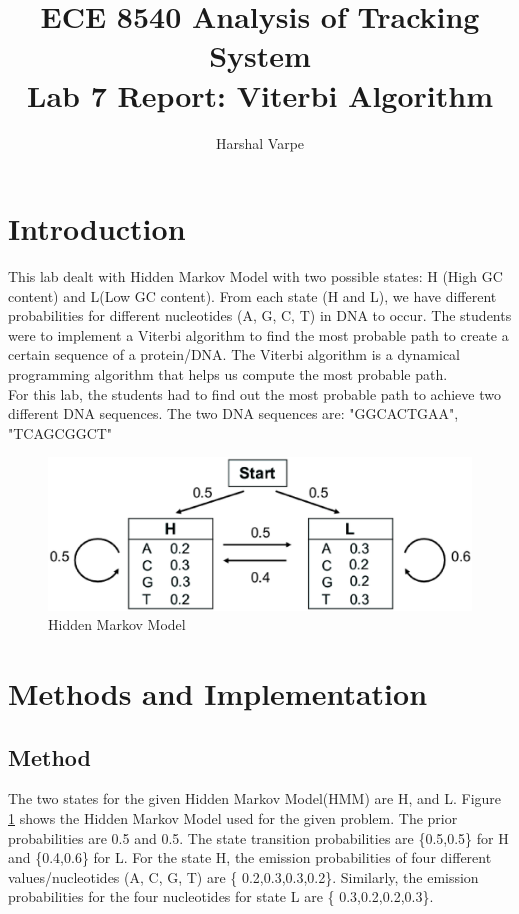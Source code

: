 \documentclass{article}
\author{ Harshal Varpe}
\title{ECE 8540 Analysis of Tracking System\\
\Large Lab 7 Report: Viterbi Algorithm }
\begin{document}
\maketitle

\section{Introduction}\label{sec:intro}

This lab dealt with Hidden Markov Model with two possible states: H (High GC content) and L(Low GC content). From each state (H and L), we have different probabilities for different nucleotides (A, G, C, T) in DNA to occur. The students were to implement a Viterbi algorithm to find the most probable path to create a certain sequence of a protein/DNA. The Viterbi algorithm is a dynamical programming algorithm that helps us compute the most probable path. \\
For this lab, the students had to find out the most probable path to achieve two different DNA sequences. The two DNA sequences are: "GGCACTGAA", "TCAGCGGCT" \\
\begin{figure}[!htb]
\begin{center}
\includegraphics[scale=0.5]{HMM.eps}
\caption{Hidden Markov Model}
\label{Fig:1}
\end{center}
\end{figure}

\section{Methods and Implementation}\label{sec:methImp}
\subsection{Method}\label{sec:Meth}
The two states for the given Hidden Markov Model(HMM) are H, and L. Figure \ref{Fig:1} shows the Hidden Markov Model used for the given problem. The prior probabilities are 0.5 and 0.5. The state transition probabilities are \{0.5,0.5\} for H and \{0.4,0.6\} for L. For the state H, the emission probabilities of four different values/nucleotides (A, C, G, T) are \{ 0.2,0.3,0.3,0.2\}. Similarly, the emission probabilities for the four nucleotides for state L are \{ 0.3,0.2,0.2,0.3\}.\\
\end{document}
